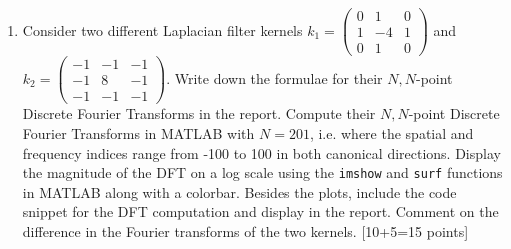 \documentclass[11pt]{article}
\begin{document}
\begin{enumerate}
\item Consider two different Laplacian filter kernels $k_1 = \begin{pmatrix}
0 & 1 & 0\\
1 & -4 & 1\\
0 & 1 & 0
\end{pmatrix}$ and $k_2 = \begin{pmatrix}
-1 & -1 & -1\\
-1 & 8 & -1\\
-1 & -1 & -1
\end{pmatrix}$. Write down the formulae for their $N, N$-point Discrete Fourier Transforms in the report. Compute their $N, N$-point Discrete Fourier Transforms in MATLAB with $N = 201$, i.e. where the spatial and frequency indices range from -100 to 100 in both canonical directions. Display the magnitude of the DFT on a log scale using the \texttt{imshow} and \texttt{surf}  functions in MATLAB along with a colorbar. Besides the plots, include the code snippet for the DFT computation and display in the report. Comment on the difference in the Fourier transforms of the two kernels. \textsf{[10+5=15 points]}

\end{enumerate}
\end{document}
